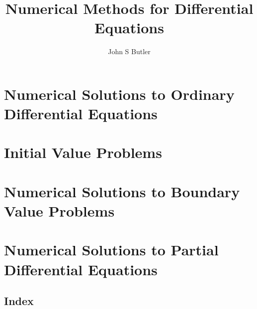 \documentclass[
  oneside,
  11pt, a4paper,
  footinclude=true,
  headinclude=true,
  cleardoublepage=empty
]{scrbook}
\title{Numerical Methods for Differential Equations}
\author{John S Butler}
\date{}
\begin{document}

%
%
%
%




%

%

\part{Numerical Solutions to Ordinary Differential Equations}
\part{Initial Value Problems}







\part{Numerical Solutions to Boundary Value Problems}

\part{Numerical Solutions to Partial Differential Equations}











\chapter{Index}
\printindex
\end{document}
